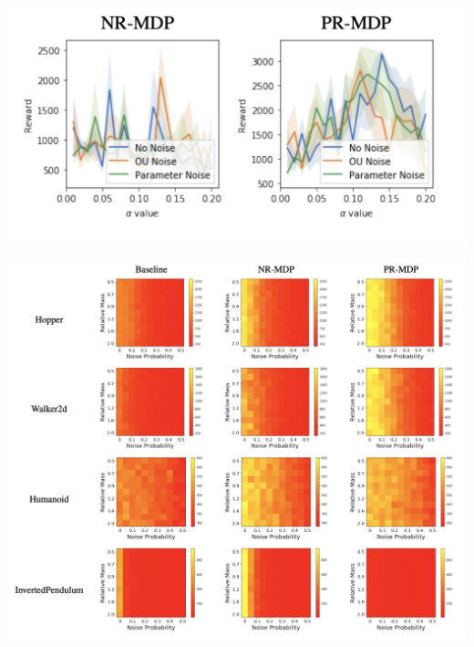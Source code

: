 \documentclass{beamer}
\begin{document}
\begin{frame}
       \includegraphics[width=1\columnwidth]{noisy.png}
\end{frame}


\begin{frame}
       \includegraphics[width=1\columnwidth]{heatmap.png}
\end{frame}
\end{document}
